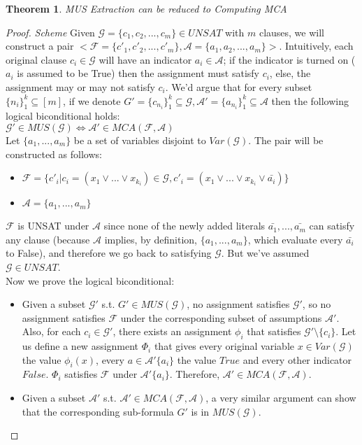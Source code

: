\documentclass[]{article}
\newtheorem{theorem}{Theorem}
\begin{document}
	\begin{theorem}
		MUS Extraction can be reduced to Computing MCA
	\end{theorem}
	\begin{proof} \textit{Scheme}
		Given $ \mathcal{G}=\{c_1,c_2,...,c_m\} \in UNSAT$ with $ m $ clauses, we will construct a pair  $ <\mathcal{F}=\{c'_1,c'_2,...,c'_m\},\mathcal{A}=\{a_1,a_2,...,a_m\}> $. Intuitively, each original clause $ c_i \in \mathcal{G} $ will have an indicator $ a_i \in \mathcal{A} $; if the indicator is turned on ($ a_i$ is assumed to be True) then the assignment must satisfy $ c_i $, else, the assignment may or may not satisfy $ c_i $. We'd argue that for every subset $\{n_i\}_1^k \subseteq [m] $, if we denote  ${G}'=\{c_{n_i}\}_1^k \subseteq \mathcal{G}, \mathcal{A}'=\{a_{n_i}\}_1^k \subseteq \mathcal{A}$ then the following logical biconditional holds: \\ 
		$ \mathcal{G}'\in MUS(\mathcal{G}) \iff  \mathcal{A}'\in MCA(\mathcal{F}, \mathcal{A}) $ \\
		Let $ \{a_1,...,a_m\} $ be a set of variables disjoint to $ Var(\mathcal{G}) $. The pair will be constructed as follows:
		\begin{itemize}
			\item $ \mathcal{F}=\{c'_i | c_i = (x_1 \lor ... \lor x_{k_i})\in\mathcal{G}, c'_i= (x_1 \lor ... \lor x_{k_i} \lor \bar{a_i}) \} $
			\item $ \mathcal{A}=\{a_1,...,a_m\} $
		\end{itemize}
	$ \mathcal{F} $ is UNSAT under $ \mathcal{A} $ since none of the newly added literals $ \bar{a_1},...,\bar{a_m} $ can satisfy any clause (because $ \mathcal{A} $ implies, by definition, $ \{a_1,...,a_m\} $, which evaluate every $ \bar{a_i} $ to False), and therefore we go back to satisfying $ \mathcal{G}$. But we've assumed $ \mathcal{G} \in UNSAT $. \\
	Now we prove the logical biconditional:
	\begin{itemize}
		\item Given a subset $ \mathcal{G}'$ s.t. $ {G}' \in MUS(\mathcal{G}) $, no assignment satisfies $ \mathcal{G}' $, so no assignment satisfies $ \mathcal{F} $ under the corresponding subset of assumptions $ \mathcal{A}'$. Also, for each $ c_i \in \mathcal{G}'$, there exists an assignment $ \phi_i $ that satisfies $ \mathcal{G}' \setminus \{c_i\}$. Let us define a new assignment $ \Phi_i $ that gives every original variable $ x \in Var(\mathcal{G}) $ the value $ \phi_i(x) $, every $ a \in \mathcal{A}'\{a_i\}$ the value $ True $ and every other indicator $ False $. $ \Phi_i $ satisfies $ \mathcal{F} $ under $\mathcal{A}'\{a_i\}$. Therefore, $ \mathcal{A}' \in MCA(\mathcal{F,A}) $.
		\item Given a subset $ \mathcal{A}'$ s.t. $ \mathcal{A}' \in MCA(\mathcal{F,A}) $, a very similar argument can show that the corresponding sub-formula $ {G}' $ is in $ MUS(\mathcal{G})$.
	\end{itemize}
	\end{proof}
\end{document}

